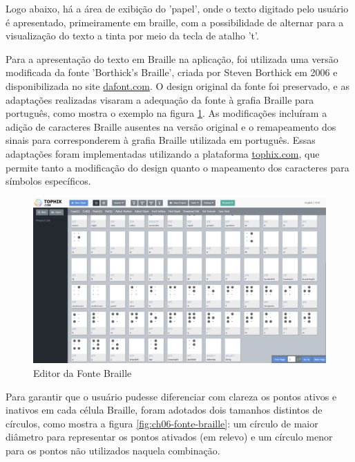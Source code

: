 Logo abaixo, há a área de exibição do 'papel', onde o texto digitado pelo usuário é apresentado, primeiramente em braille, com a possibilidade de alternar para a visualização do texto a tinta por meio da tecla de atalho 't'.

Para a apresentação do texto em Braille na aplicação, foi utilizada uma versão modificada da fonte 'Borthick's Braille', criada por Steven Borthick em 2006 e disponibilizada no site \url{dafont.com}. O design original da fonte foi preservado, e as adaptações realizadas visaram a adequação da fonte à grafia Braille para português, como mostra o exemplo na figura \ref{fig:ch06-Editor da Fonte Braille}. As modificações incluíram a adição de caracteres Braille ausentes na versão original e o remapeamento dos sinais para corresponderem à grafia Braille utilizada em português. Essas adaptações foram implementadas utilizando a plataforma \url{tophix.com}, que permite tanto a modificação do design quanto o mapeamento dos caracteres para símbolos específicos.

\begin{figure}[h]
    \centering
    \includegraphics[scale=0.3]{ch06/assets/editor-fonte.png}
    \decoRule
    \caption[Editor da Fonte Braille]{Editor da Fonte Braille}
    \label{fig:ch06-Editor da Fonte Braille}
\end{figure}

Para garantir que o usuário pudesse diferenciar com clareza os pontos ativos e inativos em cada célula Braille, foram adotados dois tamanhos distintos de círculos, como mostra a figura \ref{fig:ch06-fonte-braille}: um círculo de maior diâmetro para representar os pontos ativados (em relevo) e um círculo menor para os pontos não utilizados naquela combinação.

